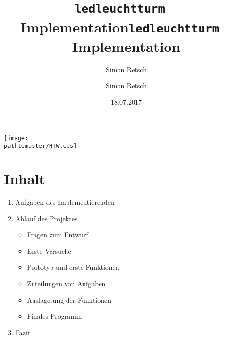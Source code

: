 \documentclass[ignorenonframetext, 11pt, table]{beamer}
\author{Simon Retsch}
\title{\texttt{ledleuchtturm} -- Implementation}
\date{18.07.2017}
\gdef\pathtomaster{../_LaTeX_master}
\begin{document}
\author{Simon Retsch}
\title{\texttt{ledleuchtturm} -- Implementation}

\begin{frame}[plain]
\begin{center}
\texttt{[image: \\pathtomaster/HTW.eps]}
\end{center}
\maketitle
\end{frame}

\section{Inhalt}
\begin{frame}
\begin{enumerate}
\setlength\itemsep{0.2em}
\item <2->Aufgaben des Implementierenden
\item <3->Ablauf des Projektes
\begin{itemize}
	\item <4->Fragen zum Entwurf
	\item <5->Erste Versuche
	\item <6->Prototyp und erste Funktionen
	\item <7->Zuteilungen von Aufgaben
	\item <8->Auslagerung der Funktionen
	\item <9->Finales Programm
\end{itemize}
\item <10->Fazit
\end{enumerate}
\end{frame}
\end{document}
